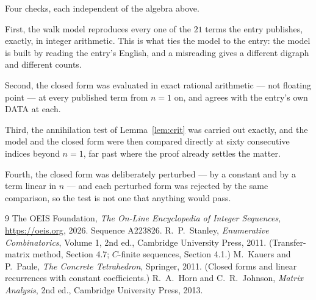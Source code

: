 \documentclass[11pt,a4paper]{article}
\theoremstyle{plain}
\theoremstyle{definition}
\begin{document}
Four checks, each independent of the algebra above.

First, the walk model reproduces every one of the $21$ terms the entry publishes,
exactly, in integer arithmetic. This is what ties the model to the entry: the model is built
by reading the entry's English, and a misreading gives a different digraph and different
counts.

Second, the closed form was evaluated in exact rational arithmetic --- not floating point ---
at every published term from $n=1$ on, and agrees with the entry's own DATA at each.

Third, the annihilation test of Lemma~\ref{lem:crit} was carried out exactly, and the model
and the closed form were then compared directly at sixty consecutive indices beyond
$n=1$, far past where the proof already settles the matter.

Fourth, the closed form was deliberately perturbed --- by a constant and by a term linear in
$n$ --- and each perturbed form was rejected by the same comparison, so the test is not one
that anything would pass.

\begin{thebibliography}{9}
 The OEIS Foundation, \emph{The On-Line Encyclopedia of Integer
Sequences}, \url{https://oeis.org}, 2026. Sequence A223826.
 R.~P.~Stanley, \emph{Enumerative Combinatorics}, Volume 1, 2nd ed.,
Cambridge University Press, 2011. (Transfer-matrix method, Section 4.7; $C$-finite sequences,
Section 4.1.)
 M.~Kauers and P.~Paule, \emph{The Concrete Tetrahedron}, Springer, 2011.
(Closed forms and linear recurrences with constant coefficients.)
 R.~A.~Horn and C.~R.~Johnson, \emph{Matrix Analysis}, 2nd ed., Cambridge
University Press, 2013.
\end{thebibliography}
\end{document}
